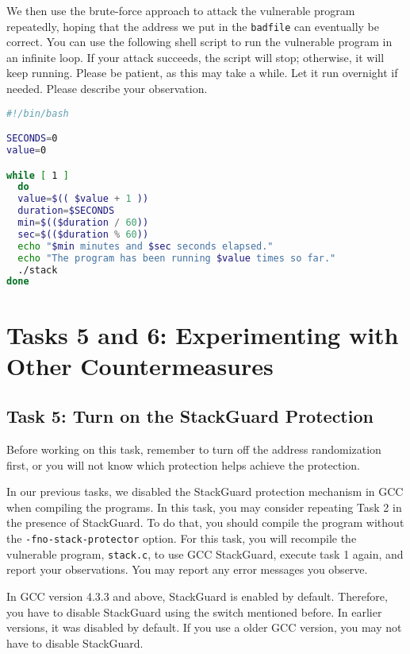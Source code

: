 We then use the brute-force approach to attack the vulnerable program repeatedly, hoping that 
the address we put in the \texttt{badfile} can eventually be correct. You can 
use the following shell script to run the vulnerable program in an infinite loop. If your
attack succeeds, the script will stop; otherwise, it will keep running. Please be patient,
as this may take a while. Let it run overnight if needed. Please describe your observation.


\begin{lstlisting}[language=bash]
#!/bin/bash

SECONDS=0
value=0

while [ 1 ]
  do
  value=$(( $value + 1 ))
  duration=$SECONDS
  min=$(($duration / 60))
  sec=$(($duration % 60))
  echo "$min minutes and $sec seconds elapsed."
  echo "The program has been running $value times so far."
  ./stack
done
\end{lstlisting}



\section{Tasks 5 and 6: Experimenting with Other Countermeasures}

\subsection{Task 5: Turn on the StackGuard Protection}

Before working on this task, remember to turn off the address
randomization first, or you will not know which protection helps 
achieve the protection.

In our previous tasks, we disabled the StackGuard protection mechanism in GCC
when compiling the programs. In this task, you may consider repeating
Task 2 
in the presence of StackGuard. To do that, you should compile
the program without the \texttt{-fno-stack-protector} option. For this
task, you will recompile the vulnerable program, \texttt{stack.c}, 
to use GCC StackGuard, execute task 1 again, and report your observations. You may
report any error messages you observe.

In GCC version 4.3.3 and above, StackGuard is enabled by
default. Therefore, you have to disable StackGuard using the switch
mentioned before. In earlier versions, it was disabled by default. If
you use a older GCC version, you may not have to disable StackGuard. 



